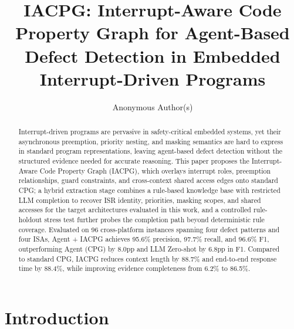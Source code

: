 \documentclass[a4paper,UKenglish,cleveref, autoref, thm-restate]{lipics-v2021}
\title{IACPG: Interrupt-Aware Code Property Graph for Agent-Based Defect Detection in Embedded Interrupt-Driven Programs} %
\author{Anonymous Author(s)}{Anonymous Affiliation}{anonymous@example.edu}{}{}
\begin{document}
\maketitle

\begin{abstract}
Interrupt-driven programs are pervasive in safety-critical embedded systems, yet their asynchronous preemption, priority nesting, and masking semantics are hard to express in standard program representations, leaving agent-based defect detection without the structured evidence needed for accurate reasoning. This paper proposes the Interrupt-Aware Code Property Graph (IACPG), which overlays interrupt roles, preemption relationships, guard constraints, and cross-context shared access edges onto standard CPG; a hybrid extraction stage combines a rule-based knowledge base with restricted LLM completion to recover ISR identity, priorities, masking scopes, and shared accesses for the target architectures evaluated in this work, and a controlled rule-holdout stress test further probes the completion path beyond deterministic rule coverage.
Evaluated on 96 cross-platform instances spanning four defect patterns and four ISAs, Agent + IACPG achieves 95.6\% precision, 97.7\% recall, and 96.6\% F1, outperforming Agent (CPG) by 8.0pp and LLM Zero-shot by 6.8pp in F1. Compared to standard CPG, IACPG reduces context length by 88.7\% and end-to-end response time by 88.4\%, while improving evidence completeness from 6.2\% to 86.5\%.
\end{abstract}


\section{Introduction}
\end{document}
